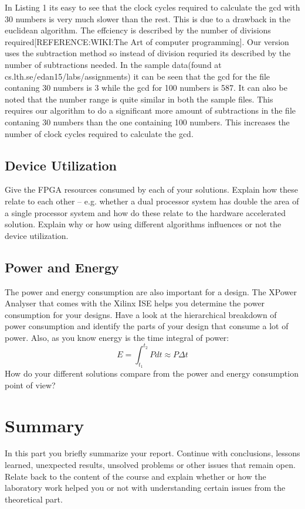 \documentclass[11pt]{article}
\begin{document}
In Listing 1 its easy to see that the clock cycles required to calculate the gcd with 30 numbers is very much slower than the rest. This is due to a drawback in the euclidean algorithm. The effciency is described by the number of divisions required[REFERENCE:WIKI:The Art of computer programming]. Our version uses the subtraction method so instead of division requried its described by the number of subtractions needed. In the sample data(found at cs.lth.se/edan15/labs/assignments) it can be seen that the gcd for the file contaning 30 numbers is 3 while the gcd for 100 numbers is 587. It can also be noted that the number range is quite similar in both the sample files. This requires our algorithm to do a significant more amount of subtractions in the file contaning 30 numbers than the one containing 100 numbers. This increases the number of clock cycles required to calculate the gcd.




\subsection{Device Utilization}
Give the FPGA resources consumed by each of your solutions. Explain how these relate to each other -- e.g. whether a dual processor system has double the area of a single processor system and how do these relate to the hardware accelerated solution. Explain why or how using different algorithms influences or not the device utilization.

\subsection{Power and Energy}
The power and energy consumption are also important for a design. The XPower Analyser that comes with the Xilinx ISE helps you determine the power consumption for your designs. Have a look at the hierarchical breakdown of power consumption and identify the parts of your design that consume a lot of power. Also, as you know energy is the time integral of power:
\begin{equation}
E = \int_{t_1}^{t_2} P dt \approx P \Delta t
\end{equation}
How do your different solutions compare from the power and energy consumption point of view?

\section{Summary}
In this part you briefly summarize your report. Continue with conclusions, lessons learned, unexpected results, unsolved problems or other issues that remain open. Relate back to the content of the course and explain whether or how the laboratory work helped you or not with understanding certain issues from the theoretical part.



\end{document}
